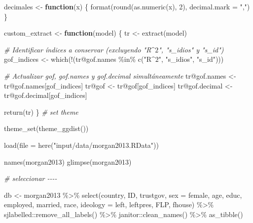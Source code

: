 \documentclass[
  12pt,
  a4paper,
]{article}
\newenvironment{Shaded}{\begin{snugshade}}{\end{snugshade}}
\newcommand{\AttributeTok}[1]{\textcolor[rgb]{0.77,0.63,0.00}{#1}}
\newcommand{\CommentTok}[1]{\textcolor[rgb]{0.56,0.35,0.01}{\textit{#1}}}
\newcommand{\ControlFlowTok}[1]{\textcolor[rgb]{0.13,0.29,0.53}{\textbf{#1}}}
\newcommand{\DecValTok}[1]{\textcolor[rgb]{0.00,0.00,0.81}{#1}}
\newcommand{\FunctionTok}[1]{\textcolor[rgb]{0.00,0.00,0.00}{#1}}
\newcommand{\NormalTok}[1]{#1}
\newcommand{\OtherTok}[1]{\textcolor[rgb]{0.56,0.35,0.01}{#1}}
\newcommand{\SpecialCharTok}[1]{\textcolor[rgb]{0.00,0.00,0.00}{#1}}
\newcommand{\StringTok}[1]{\textcolor[rgb]{0.31,0.60,0.02}{#1}}
\begin{document}
\begin{Shaded}
\begin{Highlighting}[]
\NormalTok{decimales }\OtherTok{\textless{}{-}} \ControlFlowTok{function}\NormalTok{(x) \{}
  \FunctionTok{format}\NormalTok{(}\FunctionTok{round}\NormalTok{(}\FunctionTok{as.numeric}\NormalTok{(x), }\DecValTok{2}\NormalTok{), }\AttributeTok{decimal.mark =} \StringTok{","}\NormalTok{)}
\NormalTok{\}}

\NormalTok{custom\_extract }\OtherTok{\textless{}{-}} \ControlFlowTok{function}\NormalTok{(model) \{}
\NormalTok{  tr }\OtherTok{\textless{}{-}} \FunctionTok{extract}\NormalTok{(model)}
  
  \CommentTok{\# Identificar índices a conservar (excluyendo "R$\^{}2$", "s\_idios" y "s\_id")}
\NormalTok{  gof\_indices }\OtherTok{\textless{}{-}} \FunctionTok{which}\NormalTok{(}\SpecialCharTok{!}\NormalTok{(tr}\SpecialCharTok{@}\NormalTok{gof.names }\SpecialCharTok{\%in\%} \FunctionTok{c}\NormalTok{(}\StringTok{"R$\^{}2$"}\NormalTok{, }\StringTok{"s\_idios"}\NormalTok{, }\StringTok{"s\_id"}\NormalTok{)))}
  
  \CommentTok{\# Actualizar gof, gof.names y gof.decimal simultáneamente}
\NormalTok{  tr}\SpecialCharTok{@}\NormalTok{gof.names }\OtherTok{\textless{}{-}}\NormalTok{ tr}\SpecialCharTok{@}\NormalTok{gof.names[gof\_indices]}
\NormalTok{  tr}\SpecialCharTok{@}\NormalTok{gof }\OtherTok{\textless{}{-}}\NormalTok{ tr}\SpecialCharTok{@}\NormalTok{gof[gof\_indices]}
\NormalTok{  tr}\SpecialCharTok{@}\NormalTok{gof.decimal }\OtherTok{\textless{}{-}}\NormalTok{ tr}\SpecialCharTok{@}\NormalTok{gof.decimal[gof\_indices]}
  
  \FunctionTok{return}\NormalTok{(tr)}
\NormalTok{\}}
\CommentTok{\# set theme}

\FunctionTok{theme\_set}\NormalTok{(}\FunctionTok{theme\_ggdist}\NormalTok{())}

\FunctionTok{load}\NormalTok{(}\AttributeTok{file =} \FunctionTok{here}\NormalTok{(}\StringTok{"input/data/morgan2013.RData"}\NormalTok{))}

\FunctionTok{names}\NormalTok{(morgan2013)}
\FunctionTok{glimpse}\NormalTok{(morgan2013)}

\CommentTok{\# seleccionar {-}{-}{-}{-}}

\NormalTok{db }\OtherTok{\textless{}{-}}\NormalTok{ morgan2013 }\SpecialCharTok{\%\textgreater{}\%} 
  \FunctionTok{select}\NormalTok{(country, ID, trustgov, }\AttributeTok{sex =}\NormalTok{ female, age, educ, employed, married,}
\NormalTok{         race, }\AttributeTok{ideology =}\NormalTok{ left, leftpres, FLP, fhouse) }\SpecialCharTok{\%\textgreater{}\%} 
\NormalTok{  sjlabelled}\SpecialCharTok{::}\FunctionTok{remove\_all\_labels}\NormalTok{() }\SpecialCharTok{\%\textgreater{}\%} 
\NormalTok{  janitor}\SpecialCharTok{::}\FunctionTok{clean\_names}\NormalTok{() }\SpecialCharTok{\%\textgreater{}\%} 
  \FunctionTok{as\_tibble}\NormalTok{()}
 

\end{Highlighting}
\end{Shaded}
\end{document}

